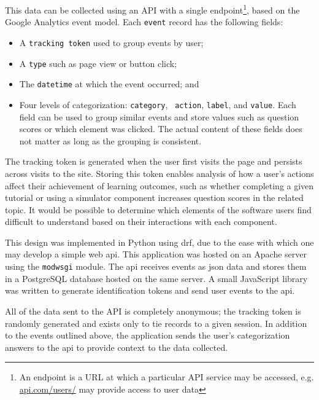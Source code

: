 \documentclass[bsc,twoside,singlespacing,parskip,logo,notimes,normalheadings]{infthesis}
\begin{document}
        This data can be collected using an API with a single
        endpoint\footnote{An endpoint is a URL at which a particular
          API service may be accessed, e.g. \url{api.com/users/} may
          provide access to user data}, based on the Google Analytics
        event model. Each {\tt event} record has the following fields:

        \begin{itemize}
        \item A {\tt tracking token} used to group events by user;
        \item A {\tt type} such as page view or button click;
        \item The {\tt datetime} at which the event occurred; and
        \item Four levels of categorization: {\tt category}, {\tt
            action}, {\tt label}, and {\tt value}. Each field can be
          used to group similar events and store values such as
          question scores or which element was clicked. The actual
          content of these fields does not matter as long as the
          grouping is consistent.
        \end{itemize}

        The tracking token is generated when the user first visits the
        page and persists across visits to the site. Storing this
        token enables analysis of how a user's actions affect their
        achievement of learning outcomes, such as whether completing a
        given tutorial or using a simulator component increases
        question scores in the related topic. It would be possible to
        determine which elements of the software users find difficult
        to understand based on their interactions with each component.

        This design was implemented in Python using
        \gls{drf}\cite{drf}, due to the ease with which one may
        develop a simple web \gls{api}. This application was hosted on
        an Apache server using the {\tt mod\textunderscore{}wsgi}
        module. The \gls{api} receives events as \gls{json} data and
        stores them in a PostgreSQL database hosted on the same
        server. A small JavaScript library was written to generate
        identification tokens and send user events to the \gls{api}.

        All of the data sent to the API is completely anonymous; the
        tracking token is randomly generated and exists only to tie
        records to a given session. In addition to the events outlined
        above, the application sends the user's categorization answers
        to the \gls{api} to provide context to the data collected.
\end{document}
